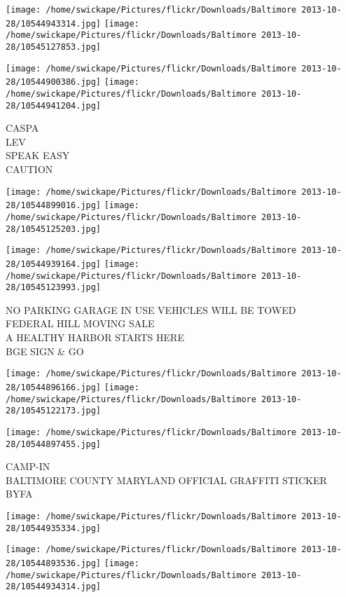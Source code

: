 \documentclass[10pt,letterpaper]{article}
\begin{document}
\texttt{[image: /home/swickape/Pictures/flickr/Downloads/Baltimore 2013-10-28/10544943314.jpg]}
\texttt{[image: /home/swickape/Pictures/flickr/Downloads/Baltimore 2013-10-28/10545127853.jpg]}

\texttt{[image: /home/swickape/Pictures/flickr/Downloads/Baltimore 2013-10-28/10544900386.jpg]}
\texttt{[image: /home/swickape/Pictures/flickr/Downloads/Baltimore 2013-10-28/10544941204.jpg]}

CASPA\\
LEV\\
SPEAK EASY\\
CAUTION
\pagebreak

\texttt{[image: /home/swickape/Pictures/flickr/Downloads/Baltimore 2013-10-28/10544899016.jpg]}
\texttt{[image: /home/swickape/Pictures/flickr/Downloads/Baltimore 2013-10-28/10545125203.jpg]}

\texttt{[image: /home/swickape/Pictures/flickr/Downloads/Baltimore 2013-10-28/10544939164.jpg]}
\texttt{[image: /home/swickape/Pictures/flickr/Downloads/Baltimore 2013-10-28/10545123993.jpg]}

NO PARKING GARAGE IN USE VEHICLES WILL BE TOWED\\
FEDERAL HILL MOVING SALE\\
A HEALTHY HARBOR STARTS HERE\\
BGE SIGN \& GO
\pagebreak

\texttt{[image: /home/swickape/Pictures/flickr/Downloads/Baltimore 2013-10-28/10544896166.jpg]}
\texttt{[image: /home/swickape/Pictures/flickr/Downloads/Baltimore 2013-10-28/10545122173.jpg]}

\vspace{0.25in}
\texttt{[image: /home/swickape/Pictures/flickr/Downloads/Baltimore 2013-10-28/10544897455.jpg]}

CAMP{-}IN\\
BALTIMORE COUNTY MARYLAND OFFICIAL GRAFFITI STICKER\\
BYFA
\pagebreak

\texttt{[image: /home/swickape/Pictures/flickr/Downloads/Baltimore 2013-10-28/10544935334.jpg]}

\vspace{0.25in}
\texttt{[image: /home/swickape/Pictures/flickr/Downloads/Baltimore 2013-10-28/10544893536.jpg]}
\texttt{[image: /home/swickape/Pictures/flickr/Downloads/Baltimore 2013-10-28/10544934314.jpg]}
\end{document}
